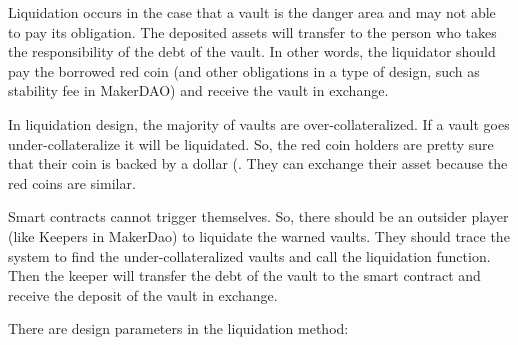 Liquidation occurs in the case that a vault is the danger area and may not able to pay its obligation. The deposited assets will transfer to the person who takes the responsibility of the debt of the vault. In other words, the liquidator should pay the borrowed red coin (and other obligations in a type of design, such as stability fee in MakerDAO) and receive the vault in exchange.


In liquidation design, the majority of vaults are over-collateralized. If a vault goes under-collateralize it will be liquidated. So, the red coin holders are pretty sure that their coin is backed by a dollar (. They can exchange their asset because the red coins are similar.

Smart contracts cannot trigger themselves. So, there should be an outsider player (like Keepers in MakerDao) to liquidate the warned vaults. They should trace the system to find the under-collateralized vaults and call the liquidation function. Then the keeper will transfer the debt of the vault to the smart contract and receive the deposit of the vault in exchange.

There are design parameters in the liquidation method:


